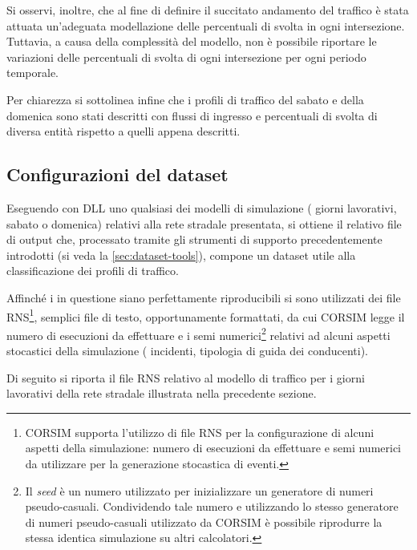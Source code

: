 Si osservi, inoltre, che al fine di definire il succitato andamento del traffico è stata attuata un'adeguata modellazione delle percentuali di svolta in ogni intersezione. Tuttavia, a causa della complessità del modello, non è possibile riportare le variazioni delle percentuali di svolta di ogni intersezione per ogni periodo temporale.

Per chiarezza si sottolinea infine che i profili di traffico del sabato e della domenica sono stati descritti con flussi di ingresso e percentuali di svolta di diversa entità rispetto a quelli appena descritti.

\subsection{Configurazioni del dataset}\label{subsec:config-ds-2}
Eseguendo con  \acs{DLL} uno qualsiasi dei modelli di simulazione (\ie{} giorni lavorativi, sabato o domenica) relativi alla rete stradale presentata, si ottiene il relativo file di output che, processato tramite gli strumenti di supporto precedentemente introdotti (si veda la \vref{sec:dataset-tools}), compone un dataset utile alla classificazione dei profili di traffico.

Affinché i  in questione siano perfettamente riproducibili si sono utilizzati dei file \acs{RNS}\footnote{\acs{CORSIM} supporta l'utilizzo di file \acf{RNS} per la configurazione di alcuni aspetti della simulazione: numero di esecuzioni da effettuare e semi numerici da utilizzare per la generazione stocastica di eventi.}, semplici file di testo, opportunamente formattati, da cui \acs{CORSIM} legge il numero di esecuzioni da effettuare e i semi numerici\footnote{Il \emph{seed} è un numero utilizzato per inizializzare un generatore di numeri pseudo-casuali. Condividendo tale numero e utilizzando lo stesso generatore di numeri pseudo-casuali utilizzato da \acs{CORSIM} è possibile riprodurre la stessa identica simulazione su altri calcolatori.} relativi ad alcuni aspetti stocastici della simulazione (\eg{} incidenti, tipologia di guida dei conducenti).

Di seguito si riporta il file \acs{RNS} relativo al modello di traffico per i giorni lavorativi della rete stradale illustrata nella precedente sezione.

